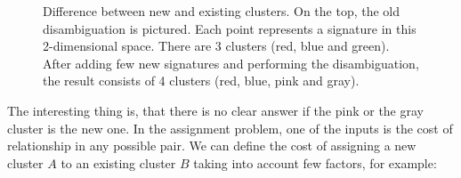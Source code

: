 \documentclass{pracamgr}
\begin{document}
\begin{figure}[H]
\caption{Difference between new and existing clusters. On the top, the old disambiguation
is pictured. Each point represents a signature in this 2-dimensional space.
There are 3 clusters (red, blue and green). After adding few
new signatures and performing the disambiguation, the result consists of 4 clusters
(red, blue, pink and gray).}
\label{fig:matching1}
\end{figure}

The interesting thing is, that there is no clear answer if the pink or the gray
cluster is the new one. In the assignment problem, one of the
inputs is the cost of relationship in any possible pair. We can define the cost of
assigning a new cluster $A$ to an existing cluster $B$ taking into account few factors,
for example:
\end{document}
